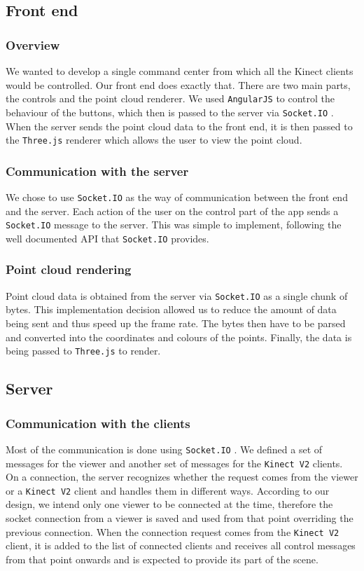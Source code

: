 \documentclass{article}
\begin{document}
\subsection{Front end}
\subsubsection{Overview}
We wanted to develop a single command center from which all the Kinect clients would be controlled. Our front end does exactly that. There are two main parts, the controls and the point cloud renderer. We used \texttt{AngularJS} \cite{angular} to control the behaviour of the buttons, which then is passed to the server via \texttt{Socket.IO} \cite{socketio}. When the server sends the point cloud data to the front end, it is then passed to the \texttt{Three.js} \cite{three} renderer which allows the user to view the point cloud.
\subsubsection{Communication with the server}
We chose to use \texttt{Socket.IO} \cite{socketio} as the way of communication between the front end and the server. Each action of the user on the control part of the app sends a \texttt{Socket.IO} \cite{socketio} message to the server. This was simple to implement, following the well documented API that \texttt{Socket.IO} \cite{socketio} provides. 
\subsubsection{Point cloud rendering}
Point cloud data is obtained from the server via \texttt{Socket.IO} \cite{socketio} as a single chunk of bytes. This implementation decision allowed us to reduce the amount of data being sent and thus speed up the frame rate. The bytes then have to be parsed and converted into the coordinates and colours of the points. Finally, the data is being passed to \texttt{Three.js} \cite{three} to render.

\subsection{Server}
\subsubsection{Communication with the clients}
Most of the communication is done using \texttt{Socket.IO} \cite{socketio}. We defined a set of messages for the viewer and another set of messages for the \texttt{Kinect V2} clients. On a connection, the server recognizes whether the request comes from the viewer or a \texttt{Kinect V2} client and handles them in different ways. According to our design, we intend only one viewer to be connected at the time, therefore the socket connection from a viewer is saved and used from that point overriding the previous connection. When the connection request comes from the \texttt{Kinect V2} client, it is added to the list of connected clients and receives all control messages from that point onwards and is expected to provide its part of the scene.
\end{document}
